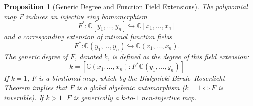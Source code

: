 \documentclass[11pt,reqno]{amsart}
\newtheorem{proposition}[theorem]{Proposition}
\theoremstyle{definition}
\begin{document}
\begin{proposition}[Generic Degree and Function Field Extensions]
The polynomial map $F$ induces an injective ring homomorphism 
$$F^*: \mathbb{C}[y_1, \dots, y_n] \hookrightarrow \mathbb{C}[x_1, \dots, x_n]$$ 
and a corresponding extension of rational function fields 
$$F^*: \mathbb{C}(y_1, \dots, y_n) \hookrightarrow \mathbb{C}(x_1, \dots, x_n).$$ 
The generic degree of $F$, denoted $k$, is defined as the degree of this field extension:
$$k = [\mathbb{C}(x_1, \dots, x_n) : F^*\mathbb{C}(y_1, \dots, y_n)]$$
If $k = 1$, $F$ is a birational map, which by the Białynicki-Birula--Rosenlicht Theorem implies that $F$ is a global algebraic automorphism ($k=1 \iff F$ is invertible). If $k > 1$, $F$ is generically a $k$-to-$1$ non-injective map.
\end{proposition}
\end{document}
